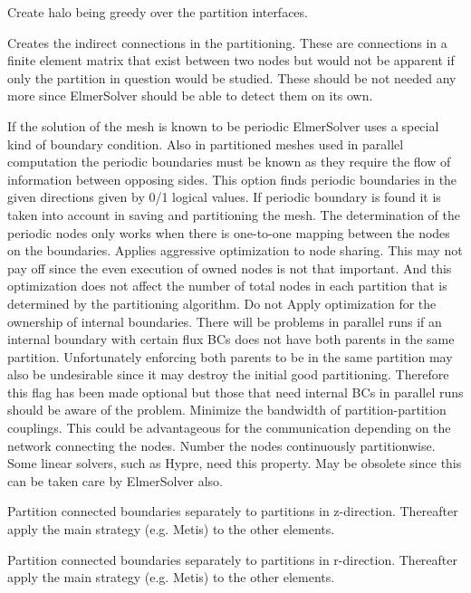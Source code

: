 Create halo being greedy over the partition interfaces. 

Creates the indirect connections in the partitioning. These are connections in 
a finite element matrix that exist between two nodes but would not be apparent if
only the partition in question would be studied. These should be not needed any more
since ElmerSolver should be able to detect them on its own. 

If the solution of the mesh is known to be periodic ElmerSolver uses
a special kind of boundary condition. Also in partitioned meshes
used in parallel computation the periodic boundaries must be known
as they require the flow of information between opposing sides.
This option finds periodic boundaries in the given directions 
given by 0/1 logical values. If periodic boundary is found it is taken into
account in saving and partitioning the mesh.
The determination of the periodic nodes only works when there is one-to-one mapping
between the nodes on the boundaries. 
%
Applies aggressive optimization to node sharing. This may not pay off since the even execution
of owned nodes is not that important. And this optimization does not affect the number of total
nodes in each partition that is determined by the partitioning algorithm. 
%
Do not Apply optimization for the ownership of internal boundaries. There will be problems in parallel runs if an 
internal boundary with certain flux BCs does not have both parents in the same partition. Unfortunately 
enforcing both parents to be in the same partition may also be undesirable since it may destroy the initial 
good partitioning. Therefore this flag has been made optional but those that need internal BCs in parallel
runs should be aware of the problem. 
%
Minimize the bandwidth of partition-partition couplings. This could be advantageous for the 
communication depending on the network connecting the nodes. 
%
Number the nodes continuously partitionwise. Some linear solvers, such as Hypre, need this 
property. May be obsolete since this can be taken care by ElmerSolver also. 

Partition connected boundaries separately to partitions in z-direction. Thereafter apply the main 
strategy (e.g. Metis) to the other elements. 

Partition connected boundaries separately to partitions in r-direction. Thereafter apply the main 
strategy (e.g. Metis) to the other elements. 

